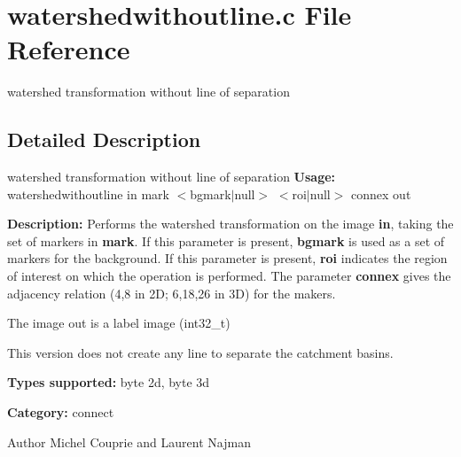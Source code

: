 \section{watershedwithoutline.c File Reference}
\label{watershedwithoutline_8c}


watershed transformation without line of separation  




\subsection{Detailed Description}
watershed transformation without line of separation {\bfseries Usage:} watershedwithoutline in mark $<$bgmark$|$null$>$ $<$roi$|$null$>$ connex out

{\bfseries Description:} Performs the watershed transformation on the image {\bfseries in}, taking the set of markers in {\bfseries mark}. If this parameter is present, {\bfseries bgmark} is used as a set of markers for the background. If this parameter is present, {\bfseries roi} indicates the region of interest on which the operation is performed. The parameter {\bfseries connex} gives the adjacency relation (4,8 in 2D; 6,18,26 in 3D) for the makers.

The image out is a label image (int32\_\-t)

This version does not create any line to separate the catchment basins.

{\bfseries Types supported:} byte 2d, byte 3d

{\bfseries Category:} connect

\begin{DoxyAuthor}{Author}
Michel Couprie and Laurent Najman 
\end{DoxyAuthor}
